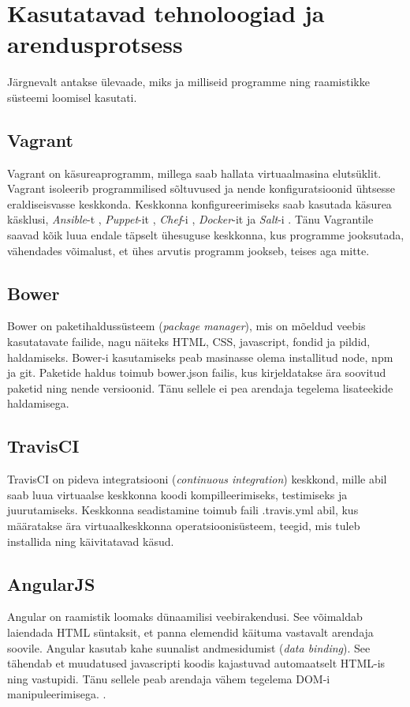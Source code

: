 \documentclass[a4paper,12pt]{article} %
\begin{document}
\section{Kasutatavad tehnoloogiad ja arendusprotsess}
Järgnevalt antakse ülevaade, miks ja milliseid programme ning raamistikke süsteemi loomisel kasutati.
\subsection{Vagrant}
Vagrant on käsureaprogramm, millega saab hallata virtuaalmasina elutsüklit. Vagrant isoleerib programmilised sõltuvused ja nende konfiguratsioonid ühtsesse eraldiseisvasse keskkonda. Keskkonna konfigureerimiseks saab kasutada käsurea käsklusi, \textit{Ansible}-t \cite{Ansible}, \textit{Puppet}-it \cite{Puppet}, \textit{Chef}-i \cite{Chef}, \textit{Docker}-it \cite{Docker} ja \textit{Salt}-i \cite{Salt}. Tänu Vagrantile saavad kõik luua endale täpselt ühesuguse keskkonna, kus programme jooksutada, vähendades võimalust, et ühes arvutis programm jookseb, teises aga mitte. \cite{Why_Vagrant}
\subsection{Bower}
Bower on paketihaldussüsteem (\textit{package manager}), mis on mõeldud veebis kasutatavate failide, nagu näiteks HTML, CSS, javascript, fondid ja pildid, haldamiseks. Bower-i kasutamiseks peab masinasse olema installitud node, npm ja git. Paketide haldus toimub bower.json failis, kus kirjeldatakse ära soovitud paketid ning nende versioonid. Tänu sellele ei pea arendaja tegelema lisateekide haldamisega. \cite{Bower}
\subsection{TravisCI}
TravisCI on pideva integratsiooni (\textit{continuous integration}) keskkond, mille abil saab luua virtuaalse keskkonna koodi kompilleerimiseks, testimiseks ja juurutamiseks. Keskkonna seadistamine toimub faili .travis.yml abil, kus määratakse ära virtuaalkeskkonna operatsioonisüsteem, teegid, mis tuleb installida ning käivitatavad käsud. \cite{TravisCI}
\subsection{AngularJS}
Angular on raamistik loomaks dünaamilisi veebirakendusi. See võimaldab laiendada HTML süntaksit, et panna elemendid käituma vastavalt arendaja soovile. Angular kasutab kahe suunalist andmesidumist (\textit{data binding}). See tähendab et muudatused javascripti koodis kajastuvad automaatselt HTML-is ning vastupidi. Tänu sellele peab arendaja vähem tegelema DOM-i manipuleerimisega.  \cite{AngularJS}.
\end{document}
